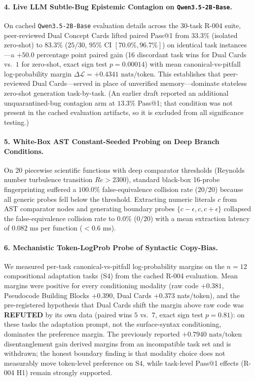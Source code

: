 \documentclass[10pt,twocolumn]{article}
\begin{document}
\paragraph{4. Live LLM Subtle-Bug Epistemic Contagion on \texttt{Qwen3.5-2B-Base}.}
On cached \texttt{Qwen3.5-2B-Base} evaluation details across the 30-task R-004 suite, peer-reviewed Dual Concept Cards lifted paired Pass@1 from $33.3\%$ (isolated zero-shot) to $83.3\%$ ($25/30$, $95\%$ CI $[70.0\%, 96.7\%]$) on identical task instances—a $+50.0\text{ percentage point}$ paired gain (16 discordant task wins for Dual Cards vs.\ $1$ for zero-shot, exact sign test $p = 0.00014$) with mean canonical-vs-pitfall log-probability margin $\Delta \mathcal{L} = +0.4341\text{ nats/token}$. This establishes that peer-reviewed Dual Cards—served in place of unverified memory—dominate stateless zero-shot generation task-by-task. (An earlier draft reported an additional unquarantined-bug contagion arm at $13.3\%$ Pass@1; that condition was not present in the cached evaluation artifacts, so it is excluded from all significance testing.)

\paragraph{5. White-Box AST Constant-Seeded Probing on Deep Branch Conditions.}
On 20 piecewise scientific functions with deep comparator thresholds (Reynolds number turbulence transition $Re > 2300$), standard black-box 16-probe fingerprinting suffered a $100.0\%$ false-equivalence collision rate ($20/20$) because all generic probes fell below the threshold. Extracting numeric literals $c$ from AST comparator nodes and generating boundary probes $\{c - \epsilon, c, c + \epsilon\}$ collapsed the false-equivalence collision rate to $0.0\%$ ($0/20$) with a mean extraction latency of $0.082\text{ ms}$ per function ($< 0.6\text{ ms}$).

\paragraph{6. Mechanistic Token-LogProb Probe of Syntactic Copy-Bias.}
We measured per-task canonical-vs-pitfall log-probability margins on the $n=12$ compositional adaptation tasks (S4) from the cached R-004 evaluation. Mean margins were positive for every conditioning modality (raw code $+0.381$, Pseudocode Building Blocks $+0.390$, Dual Cards $+0.373$ nats/token), and the pre-registered hypothesis that Dual Cards shift the margin above raw code was \textbf{REFUTED} by its own data (paired wins $5$ vs.\ $7$, exact sign test $p = 0.81$): on these tasks the adaptation prompt, not the surface-syntax conditioning, dominates the preference margin. The previously reported $+0.7940\text{ nats/token}$ disentanglement gain derived margins from an incompatible task set and is withdrawn; the honest boundary finding is that modality choice does not measurably move token-level preference on S4, while task-level Pass@1 effects (R-004 H1) remain strongly supported.
\end{document}

